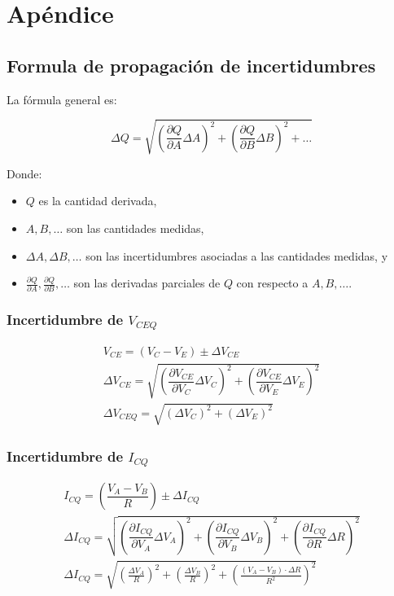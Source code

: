 
\section{Apéndice} \label{sec:apendice}

\subsection{Formula de propagación de incertidumbres}

La fórmula general es:

\[ \Delta Q = \sqrt{\left(\frac{\partial Q}{\partial A} \Delta A\right)^2 + \left(\frac{\partial Q}{\partial B} \Delta B\right)^2 + \ldots}
    \label{eqn:incertidumbre}
\]

Donde:
\begin{itemize}
    \item \( Q \) es la cantidad derivada,
    \item \( A, B, \ldots \) son las cantidades medidas,
    \item \( \Delta A, \Delta B, \ldots \) son las incertidumbres asociadas a las cantidades medidas, y
    \item \( \frac{\partial Q}{\partial A}, \frac{\partial Q}{\partial B}, \ldots \) son las derivadas parciales de \( Q \) con respecto a \( A, B, \ldots \).
\end{itemize}


\subsubsection{Incertidumbre de $V_{CEQ}$}
\begin{gather}
    V_{CE}=(V_C-V_E)\pm \Delta V_{CE} \nonumber \\[0.2cm]
    \Delta V_{CE} =  \sqrt{\left(\dfrac{\partial V_{CE}}{\partial V_C}\Delta V_C\right)^2+\left(\dfrac{\partial V_{CE}}{\partial V_E}\Delta V_E\right)^2} \nonumber \\[0.2cm]
    \Delta V_{CEQ} = \sqrt{\left(\Delta V_C\right)^2 + \left(\Delta V_E\right)^2}
    \label{eqn:incertidumbre_vce}
\end{gather}

\subsubsection{Incertidumbre de $I_{CQ}$}
\begin{gather}
    I_{CQ} = \left(\dfrac{V_{A}-V_B}{R}\right) \pm \Delta I_{CQ} \nonumber \\[0.2cm]
    \Delta I_{CQ} =  \sqrt{\left(\dfrac{\partial I_{CQ}}{\partial V_{A}}\Delta V_{A}\right)^2+\left(\dfrac{\partial I_{CQ}}{\partial V_B}\Delta V_B\right)^2+\left(\dfrac{\partial I_{CQ}}{\partial R}\Delta R\right)^2} \nonumber \\[0.2cm]
    \Delta I_{CQ} = \sqrt{\left(\frac{\Delta V_{A}}{R}\right)^2 + \left(\frac{\Delta V_{B}}{R}\right)^2 + \left(\frac{(V_{A} - V_{B}) \cdot \Delta R}{R^2}\right)^2}
    \label{eqn:incertidumbre_ic}
\end{gather}

